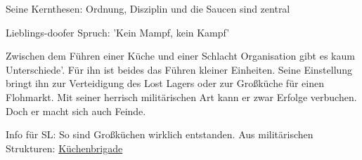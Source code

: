 Seine Kernthesen: Ordnung, Disziplin und die Saucen sind zentral

Lieblings-doofer Spruch: 'Kein Mampf, kein Kampf'


Zwischen dem Führen einer Küche und einer Schlacht Organisation gibt es kaum Unterschiede'. Für ihn ist beides das Führen kleiner Einheiten. Seine Einstellung bringt ihn zur Verteidigung des Lost Lagers oder zur Großküche für einen Flohmarkt. Mit seiner herrisch militärischen Art kann er zwar Erfolge verbuchen. Doch er macht sich auch Feinde.

Info für SL: So sind Großküchen wirklich entstanden. Aus militärischen Strukturen: \href{https://de.wikipedia.org/wiki/K%C3%BCchenbrigade}{Küchenbrigade}


\newpage
\begin{npcBox}[title=Gustav Müller]

    \begin{aspects}
    \item {}
    \item {}
    \item {}
    \item {}
    \end{aspects}

    \begin{skills}
    \item {}
    \item {}
    \item {}
    \item {}
    \item {}
    \item {}
    \item {}
    \item {}
    \item {}
    \item {}
    \item {}
    \item {}
    \item {}
    \item {}
    \item {}
    \item {}
    \item {}
    \item {}
    \item {}
    \end{skills}


\end{npcBox}

